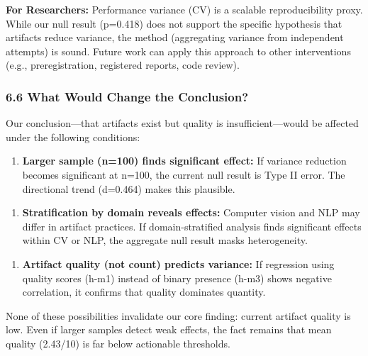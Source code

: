 \textbf{For Researchers:} Performance variance (CV) is a scalable reproducibility proxy. While our null result (p=0.418) does not support the specific hypothesis that artifacts reduce variance, the method (aggregating variance from independent attempts) is sound. Future work can apply this approach to other interventions (e.g., preregistration, registered reports, code review).

\subsubsection{6.6 What Would Change the Conclusion?}

Our conclusion---that artifacts exist but quality is insufficient---would be affected under the following conditions:

\begin{enumerate}
\item \textbf{Larger sample (n=100) finds significant effect:} If variance reduction becomes significant at n=100, the current null result is Type II error. The directional trend (d=0.464) makes this plausible.
\end{enumerate}

\begin{enumerate}
\item \textbf{Stratification by domain reveals effects:} Computer vision and NLP may differ in artifact practices. If domain-stratified analysis finds significant effects within CV or NLP, the aggregate null result masks heterogeneity.
\end{enumerate}

\begin{enumerate}
\item \textbf{Artifact quality (not count) predicts variance:} If regression using quality scores (h-m1) instead of binary presence (h-m3) shows negative correlation, it confirms that quality dominates quantity.
\end{enumerate}

None of these possibilities invalidate our core finding: current artifact quality is low. Even if larger samples detect weak effects, the fact remains that mean quality (2.43/10) is far below actionable thresholds.
